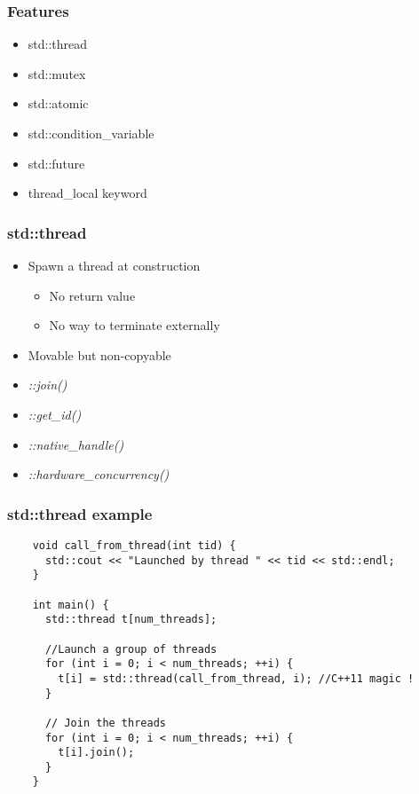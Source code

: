 \begin{frame}
  \frametitle{Features}

  \begin{itemize}
  \item std::thread
  \item std::mutex
  \item std::atomic
  \item std::condition\_variable
  \item std::future
  \item thread\_local keyword
  \end{itemize}
\end{frame}

\begin{frame}
  \frametitle{std::thread}

  \begin{itemize}
  \item Spawn a thread at construction
    \begin{itemize}
    \item No return value
    \item No way to terminate externally
    \end{itemize}
  \item Movable but non-copyable
  \item \emph{::join()}
  \item \emph{::get\_id()}
  \item \emph{::native\_handle()}
  \item \emph{::hardware\_concurrency()}
  \end{itemize}
\end{frame}

\begin{frame}[fragile]
  \frametitle{std::thread example}

  \begin{verbatim}
    void call_from_thread(int tid) {
      std::cout << "Launched by thread " << tid << std::endl;
    }

    int main() {
      std::thread t[num_threads];

      //Launch a group of threads
      for (int i = 0; i < num_threads; ++i) {
        t[i] = std::thread(call_from_thread, i); //C++11 magic !
      }

      // Join the threads
      for (int i = 0; i < num_threads; ++i) {
        t[i].join();
      }
    }
  \end{verbatim}
\end{frame}


